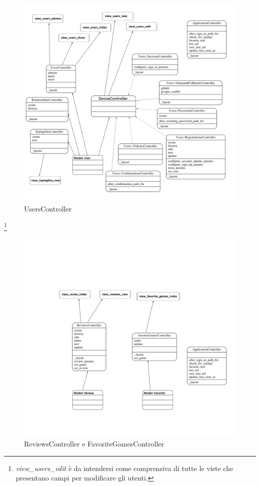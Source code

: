 \begin{figure}[hbt!]
    \centering
    \includegraphics[width=\textwidth]{users_controller.png}
    \caption{UsersController}
\end{figure}
\FloatBarrier
\footnote{\emph{view\_users\_edit} è da intendersi come comprensiva di tutte le viste che presentano campi per modificare gli utenti.}

\begin{figure}[hbt!]
    \centering
    \includegraphics[width=\textwidth]{reviews_favorites_controller.png}
    \caption{ReviewsController e FavoriteGamesController}
\end{figure}